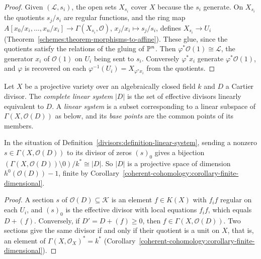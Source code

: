\begin{proof}
Given $(\mathcal{L}, s_i)$, the open sets $X_{s_i}$ cover $X$ because the $s_i$ generate. On $X_{s_i}$ the quotients $s_j/s_i$ are regular functions, and the
ring map $A[x_0/x_i, \ldots, x_n/x_i] \to \Gamma(X_{s_i}, \mathcal{O})$, $x_j/x_i \mapsto s_j/s_i$, defines $X_{s_i} \to U_i$
(Theorem~\ref{schemes:theorem-morphisms-to-affine}). These glue, since the quotients satisfy the relations of the gluing of $\mathbb{P}^n$. Then
$\varphi^*\mathcal{O}(1) \cong \mathcal{L}$, the generator $x_i$ of $\mathcal{O}(1)$ on $U_i$ being sent to $s_i$. Conversely $\varphi^*x_i$ generate $\varphi^*\mathcal{O}(1)$, and
$\varphi$ is recovered on each $\varphi^{-1}(U_i) = X_{\varphi^*x_i}$ from the quotients.
\end{proof}

\begin{definition}\label{divisors:definition-linear-system}
Let $X$ be a projective variety over an algebraically closed field $k$ and $D$ a Cartier divisor. The \emph{complete linear system} $|D|$ is the set of effective divisors
linearly equivalent to $D$. A \emph{linear system} is a subset corresponding to a linear subspace of $\Gamma(X, \mathcal{O}(D))$ as below, and its \emph{base points}
are the common points of its members.
\end{definition}

\begin{proposition}\label{divisors:proposition-linear-system}
In the situation of Definition~\ref{divisors:definition-linear-system}, sending a nonzero $s \in \Gamma(X, \mathcal{O}(D))$ to its divisor of zeros $(s)_0$ gives a bijection
$(\Gamma(X, \mathcal{O}(D)) \setminus 0)/k^* \cong |D|$. So $|D|$ is a projective space of dimension $h^0(\mathcal{O}(D)) - 1$, finite by
Corollary~\ref{coherent-cohomology:corollary-finite-dimensional}.
\end{proposition}

\begin{proof}
A section $s$ of $\mathcal{O}(D) \subseteq \mathcal{K}$ is an element $f \in K(X)$ with $f_if$ regular on each $U_i$, and $(s)_0$ is the effective divisor with local equations
$f_if$, which equals $D + (f)$. Conversely, if $D' = D + (f) \geq 0$, then $f \in \Gamma(X, \mathcal{O}(D))$. Two sections give the same divisor if and only if their quotient
is a unit on $X$, that is, an element of $\Gamma(X, \mathcal{O}_X)^* = k^*$ (Corollary~\ref{coherent-cohomology:corollary-finite-dimensional}).
\end{proof}

